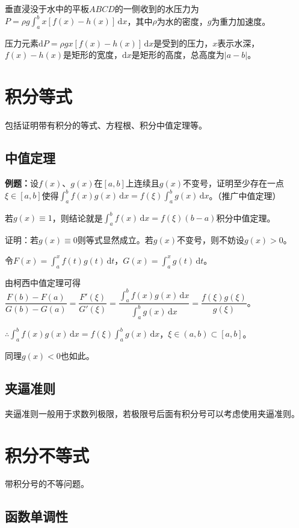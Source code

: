 \documentclass[UTF8, 12pt]{ctexart}
\begin{document}
垂直浸没于水中的平板$ABCD$的一侧收到的水压力为$P=\rho g\int_a^bx[f(x)-h(x)]\,\textrm{d}x$，其中$\rho$为水的密度，$g$为重力加速度。

压力元素$\textrm{d}P=\rho gx[f(x)-h(x)]\,\textrm{d}x$是受到的压力，$x$表示水深，$f(x)-h(x)$是矩形的宽度，$\textrm{d}x$是矩形的高度，总高度为$\vert a-b\vert$。

\section{积分等式}

包括证明带有积分的等式、方程根、积分中值定理等。

\subsection{中值定理}

\textbf{例题：}设$f(x)$、$g(x)$在$[a,b]$上连续且$g(x)$不变号，证明至少存在一点$\xi\in[a,b]$使得$\int_a^bf(x)g(x)\,\textrm{d}x=f(\xi)\int_a^bg(x)\,\textrm{d}x$。（推广中值定理）

若$g(x)\equiv1$，则结论就是$\int_a^bf(x)\,\textrm{d}x=f(\xi)(b-a)$积分中值定理。

证明：若$g(x)\equiv0$则等式显然成立。若$g(x)$不变号，则不妨设$g(x)>0$。

令$F(x)=\int_a^xf(t)g(t)\,\textrm{d}t$，$G(x)=\int_a^xg(t)\,\textrm{d}t$。

由柯西中值定理可得$\dfrac{F(b)-F(a)}{G(b)-G(a)}=\dfrac{F'(\xi)}{G'(\xi)}=\dfrac{\int_a^bf(x)g(x)\,\textrm{d}x}{\int_a^bg(x)\,\textrm{d}x}=\dfrac{f(\xi)g(\xi)}{g(\xi)}$。

$\therefore\int_a^bf(x)g(x)\,\textrm{d}x=f(\xi)\int_a^bg(x)\,\textrm{d}x$，$\xi\in(a,b)\subset[a,b]$。

同理$g(x)<0$也如此。

\subsection{夹逼准则}

夹逼准则一般用于求数列极限，若极限号后面有积分号可以考虑使用夹逼准则。

\section{积分不等式}

带积分号的不等问题。

\subsection{函数单调性}
\end{document}
